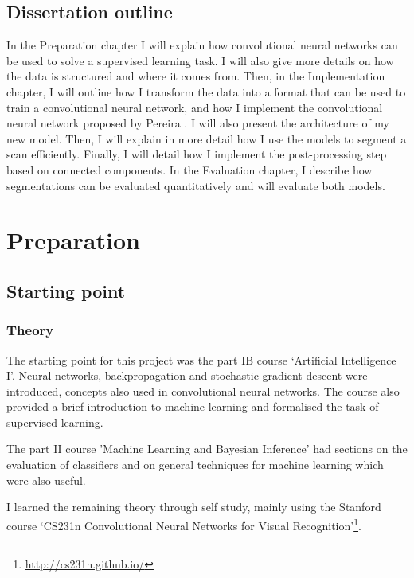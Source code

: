 \documentclass[12pt,a4paper,twoside,openright]{report}
\begin{document}
\section{Dissertation outline}
In the Preparation chapter I will explain how convolutional neural networks can be used to solve a supervised learning task. I will also give more details on how the data is structured and where it comes from. Then, in the Implementation chapter, I will outline  how I transform the data into a format that can be used to train a convolutional neural network, and how I implement the convolutional neural network proposed by Pereira \cite{pereira}. I will also present the architecture of my new model. Then, I will explain in more detail how I use the models to segment a scan efficiently. Finally, I will detail how I implement the post-processing step based on connected components. In the Evaluation chapter, I describe how segmentations can be evaluated quantitatively and will evaluate both models.

\chapter{Preparation}

\section{Starting point}
\subsection{Theory}
The starting point for this project was the part IB course `Artificial Intelligence I'. Neural networks, backpropagation and stochastic gradient descent were introduced, concepts also used in convolutional neural networks. The course also provided a brief introduction to machine learning and formalised the task of supervised learning.

The part II course 'Machine Learning and Bayesian Inference' had sections on the evaluation of classifiers and on general techniques for machine learning which were also useful.

I learned the remaining theory through self study, mainly using the Stanford course `CS231n Convolutional Neural Networks for Visual Recognition'\footnote{\url{http://cs231n.github.io/}}.
\end{document}
